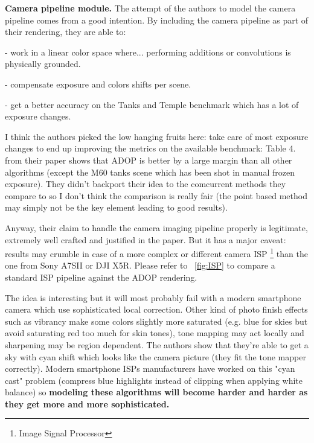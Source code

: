 \noindent \textbf{Camera pipeline module.}
The attempt of the authors to model the camera pipeline comes from a good intention. By including the camera pipeline as part of their rendering, they are able to: 

\noindent - work in a linear color space where... performing additions or convolutions is physically grounded.

\noindent - compensate exposure and colors shifts per scene.

\noindent - get a better accuracy on the Tanks and Temple benchmark which has a lot of exposure changes.

\noindent I think the authors picked the low hanging fruits here: take care of most exposure changes to end up improving the metrics on the available benchmark: Table 4. from their paper shows that ADOP is better by a large margin than all other algorithms (except the M60 tanks scene which has been shot in manual frozen exposure). 
They didn't backport their idea to the comcurrent methods they compare to so I don't think the comparison is really fair (the point based method may simply not be the key element leading to good results).

\noindent  Anyway, their claim to handle the camera imaging pipeline properly is legitimate, extremely well crafted and justified in the paper. But it has a major caveat: results may crumble in case of a more complex or different camera ISP \footnote{Image Signal Processor} than the one from Sony A7SII or DJI X5R.
Please refer to ~\cref{fig:ISP} to compare a standard ISP pipeline against the ADOP rendering.

\noindent The idea is interesting but it will most probably fail with a modern smartphone camera which use sophisticated local correction. Other kind of photo finish effects such as vibrancy make some colors slightly more saturated (e.g. blue for skies but avoid saturating red too much for skin tones), tone mapping may act locally \cite{aubry2014fast} and sharpening may be region dependent. The authors show that they're able to get a sky with cyan shift which looks like the camera picture (they fit the tone mapper correctly). Modern smartphone ISPs manufacturers have worked on this "cyan cast" problem (compress blue highlights instead of clipping when applying white balance) so \textbf{modeling these algorithms will become harder and harder as they get more and more sophisticated.}


